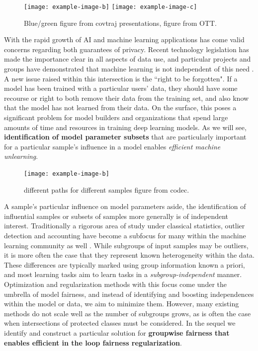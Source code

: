 \begin{figure}
    \centering
    \texttt{[image: example-image-b]}
    \texttt{[image: example-image-c]}
    \caption[Selecting feature subsets]{\color{red} Blue/green figure from covtraj presentations, figure from OTT.}
\end{figure}

With the rapid growth of AI and machine learning applications has come valid concerns regarding both guarantees of privacy.
Recent technology legislation has made the importance clear in all aspects of data use,
and particular projects and groups have demonstrated that machine learning is not independent of
this need \citep{Exposing}.
A new issue raised within this intersection is the ``right to be forgotten".
If a model has been trained with a particular users' data, 
they should have some recourse or right
to both remove their data from the training set,
and also know that the model has not learned from their data.
On the surface, this poses a significant problem for model builders
and organizations that spend large amounts
of time and resources in 
training deep learning models.
As we will see, 
\textbf{identification of model parameter subsets}
that are particularly important
for a particular sample's influence
in a model enables \textit{efficient machine unlearning}.

\begin{figure}
    \centering
    \texttt{[image: example-image-b]}
    \caption[Selecting parameter subsets]{\color{red} different paths for different samples figure from codec.}
\end{figure}

A sample's particular influence on model parameters aside, the identification of influential samples or subsets of samples more generally is of independent interest. 
Traditionally a rigorous area of study under classical statistics, outlier detection and accounting have become a subfocus for many within the machine learning community as well \citep{golatkar2020eternal,golatkar2020forgetting,huang2020feature,ren2019likelihood}.
While subgroups of input samples may be outliers, it is more often the case that they represent known heterogeneity within the data. 
These differences are typically marked using 
group information known a priori, and 
most learning tasks aim to learn tasks
in a \textit{subgroup-independent} manner.
Optimization and regularization methods with this focus come under the umbrella of model fairness, and instead of identifying and boosting independences within the model or data, we aim to minimize them.
However, many existing methods do not scale well as the number of subgroups grows, as is often the case when intersections of protected classes must be considered. In the sequel we identify and construct a particular solution for \textbf{groupwise fairness that enables efficient in the loop fairness regularization}.

